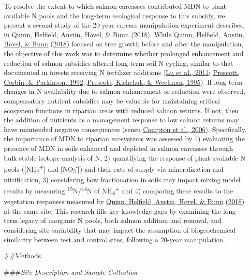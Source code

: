 \documentclass [11pt, proquest] {uwthesis}[2015/03/03]
\begin{document}
To resolve the extent to which salmon carcasses contributed MDN to plant-available N pools and the long-term ecological response to this subsidy, we present a second study of the 20-year carcass manipulation experiment described in \protect\hyperlink{ref-Quinn2018}{Quinn, Helfield, Austin, Hovel, \& Bunn} (\protect\hyperlink{ref-Quinn2018}{2018}). While \protect\hyperlink{ref-Quinn2018}{Quinn, Helfield, Austin, Hovel, \& Bunn} (\protect\hyperlink{ref-Quinn2018}{2018}) focused on tree growth before and after the manipulation, the objective of this work was to determine whether prolonged enhancement and reduction of salmon subsidies altered long-term soil N cycling, similar to that documented in forests receiving N fertilizer additions (\protect\hyperlink{ref-Lu2011}{Lu et al., 2011}; \protect\hyperlink{ref-Prescott1992}{Prescott, Corbin, \& Parkinson, 1992}; \protect\hyperlink{ref-Prescott1995}{Prescott, Kishchuk, \& Weetman, 1995}). If long-term changes in N availability due to salmon enhancement or reduction were observed, compensatory nutrient subsidies may be valuable for maintaining critical ecosystem functions in riparian areas with reduced salmon returns. If not, then the addition of nutrients as a management response to low salmon returns may have unintended negative consequences (sensu \protect\hyperlink{ref-Compton2006}{Compton et al., 2006}). Specifically, the importance of MDN to riparian ecosystems was assessed by 1) evaluating the presence of MDN in soils enhanced and depleted in salmon carcasses through bulk stable isotope analysis of N, 2) quantifying the response of plant-available N pools ({[}NH\textsubscript{4}\textsuperscript{+}{]} and {[}NO\textsubscript{3}\textsuperscript{-}{]}) and their rate of supply via mineralization and nitrification, 3) considering how fractionation in soils may impact mixing model results by measuring \textsuperscript{15}N/\textsuperscript{14}N of NH\textsubscript{4}\textsuperscript{+} and 4) comparing these results to the vegetation responses measured by \protect\hyperlink{ref-Quinn2018}{Quinn, Helfield, Austin, Hovel, \& Bunn} (\protect\hyperlink{ref-Quinn2018}{2018}) at the same site. This research fills key knowledge gaps by examining the long-term legacy of inorganic N pools, both salmon addition and removal, and considering site variability that may impact the assumption of biogeochemical similarity between test and control sites, following a 20-year manipulation.

\#\#Methods

\#\#\#\emph{Site Description and Sample Collection}
\end{document}
